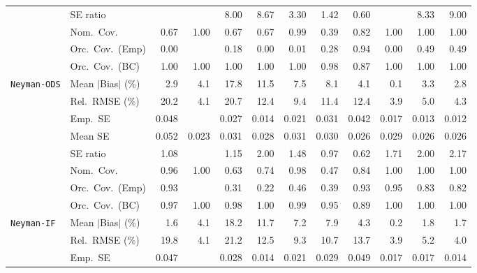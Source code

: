 \begin{landscape}
\begin{longtable}{llrrrrrrrrrr}
 & SE ratio &  &  & 8.00 & 8.67 & \cellcolor{rankthree}3.30 & \cellcolor{ranktwo}1.42 & \cellcolor{rankone}0.60 &  & 8.33 & 9.00 \\
 & Nom.\ Cov. & 0.67 & \cellcolor{ranktwo}1.00 & 0.67 & 0.67 & \cellcolor{rankone}0.99 & 0.39 & 0.82 & \cellcolor{rankthree}1.00 & 1.00 & 1.00 \\
 & Orc.\ Cov.\ (Emp) & 0.00 &  & 0.18 & 0.00 & 0.01 & 0.28 & \cellcolor{rankone}0.94 & 0.00 & \cellcolor{ranktwo}0.49 & \cellcolor{rankthree}0.49 \\
 & Orc.\ Cov.\ (BC) & \cellcolor{ranktwo}1.00 & \cellcolor{rankthree}1.00 & 1.00 & 1.00 & 1.00 & \cellcolor{rankone}0.98 & 0.87 & 1.00 & 1.00 & 1.00 \\
\addlinespace[2pt]
\quad \texttt{Neyman-ODS} & Mean $|$Bias$|$ (\%) & \cellcolor{rankthree}2.9 & 4.1 & 17.8 & 11.5 & 7.5 & 8.1 & 4.1 & \cellcolor{rankone}0.1 & 3.3 & \cellcolor{ranktwo}2.8 \\
 & Rel.\ RMSE (\%) & 20.2 & \cellcolor{ranktwo}4.1 & 20.7 & 12.4 & 9.4 & 11.4 & 12.4 & \cellcolor{rankone}3.9 & 5.0 & \cellcolor{rankthree}4.3 \\
 & Emp.\ SE & 0.048 &  & 0.027 & 0.014 & 0.021 & 0.031 & 0.042 & 0.017 & 0.013 & 0.012 \\
 & Mean SE & 0.052 & 0.023 & 0.031 & 0.028 & 0.031 & 0.030 & 0.026 & 0.029 & 0.026 & 0.026 \\
 & SE ratio & \cellcolor{ranktwo}1.08 &  & \cellcolor{rankthree}1.15 & 2.00 & 1.48 & \cellcolor{rankone}0.97 & 0.62 & 1.71 & 2.00 & 2.17 \\
 & Nom.\ Cov. & \cellcolor{rankone}0.96 & 1.00 & 0.63 & 0.74 & \cellcolor{ranktwo}0.98 & 0.47 & 0.84 & 1.00 & \cellcolor{rankthree}1.00 & 1.00 \\
 & Orc.\ Cov.\ (Emp) & \cellcolor{rankthree}0.93 &  & 0.31 & 0.22 & 0.46 & 0.39 & \cellcolor{ranktwo}0.93 & \cellcolor{rankone}0.95 & 0.83 & 0.82 \\
 & Orc.\ Cov.\ (BC) & \cellcolor{ranktwo}0.97 & 1.00 & \cellcolor{rankthree}0.98 & 1.00 & 0.99 & \cellcolor{rankone}0.95 & 0.89 & 1.00 & 1.00 & 1.00 \\
\addlinespace[2pt]
\quad \texttt{Neyman-IF} & Mean $|$Bias$|$ (\%) & \cellcolor{ranktwo}1.6 & 4.1 & 18.2 & 11.7 & 7.2 & 7.9 & 4.3 & \cellcolor{rankone}0.2 & 1.8 & \cellcolor{rankthree}1.7 \\
 & Rel.\ RMSE (\%) & 19.8 & \cellcolor{rankthree}4.1 & 21.2 & 12.5 & 9.3 & 10.7 & 13.7 & \cellcolor{rankone}3.9 & 5.2 & \cellcolor{ranktwo}4.0 \\
 & Emp.\ SE & 0.047 &  & 0.028 & 0.014 & 0.021 & 0.029 & 0.049 & 0.017 & 0.017 & 0.014 \\

\end{longtable}
\end{landscape}
